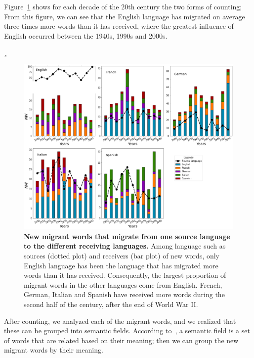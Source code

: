 \documentclass[10pt,letterpaper]{article} %
\begin{document}
	Figure~\ref{fig.NMW_A} shows for each decade of the 20th century the two forms of counting; From this figure, we can see that the English language has migrated on average three times more words than it has received, where the greatest influence of English occurred between the 1940s, 1990s and 2000s.
	
	¸
		\begin{figure}[!h] %
		\begin{adjustwidth}{-1.2in}{0in}
			\includegraphics[scale=.35]{NW_A.png}
			\caption{{\bf New migrant words that migrate from one source language to the different receiving languages.} Among language such as sources (dotted plot) and receivers (bar plot) of new words, only English language has been the language that has migrated more words than it has received. Consequently, the largest proportion of migrant words in the other languages ​​come from English. French, German, Italian and Spanish have received more words during the second half of the century, after the end of World War II.	
			}
			\label{fig.NMW_A}
		\end{adjustwidth}
	\end{figure} %
	
	
	After counting, we analyzed each of the migrant words, and we realized that these can be grouped into semantic fields. According to~\cite{semantic_oxford}, a semantic field is a set of words that are related based on their meaning; then we can group the new migrant words by their meaning.
	
\end{document}
